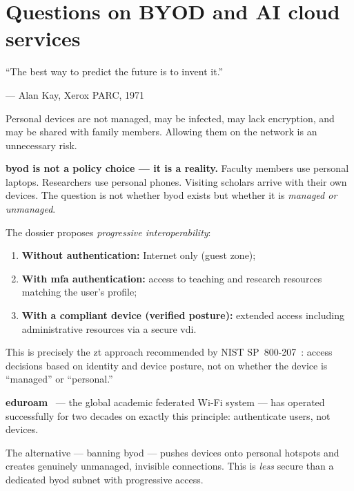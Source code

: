 \section{Questions on BYOD and AI cloud services}
\label{sec:q-byod-ai}

\epigraph{``The best way to predict the future is to invent it.''}{--- Alan Kay, Xerox PARC, 1971}

\begin{questionbox}
Personal devices are not managed, may be infected, may lack encryption, and may be shared with family members. Allowing them on the network is an unnecessary risk.
\end{questionbox}

\begin{answerbox}[Answer to Q4.1]
\textbf{\gls{byod} is not a policy choice --- it is a reality.} Faculty members use personal laptops. Researchers use personal phones. Visiting scholars arrive with their own devices. The question is not whether \gls{byod} exists but whether it is \emph{managed or unmanaged}.

\medskip\noindent The dossier proposes \emph{progressive interoperability}:
\begin{enumerate}[nosep]
    \item \textbf{Without authentication:} Internet only (guest zone);
    \item \textbf{With \gls{mfa} authentication:} access to teaching and research resources matching the user's profile;
    \item \textbf{With a compliant device (verified posture):} extended access including administrative resources via a secure \gls{vdi}.
\end{enumerate}

This is precisely the \gls{zt} approach recommended by NIST SP~800-207~\cite{nist-zt}: access decisions based on identity and device posture, not on whether the device is ``managed'' or ``personal.''

\medskip\noindent\textbf{\gls{eduroam}}~\cite{eduroam} --- the global academic federated Wi-Fi system --- has operated successfully for two decades on exactly this principle: authenticate users, not devices.

\medskip\noindent The alternative --- banning \gls{byod} --- pushes devices onto personal hotspots and creates genuinely unmanaged, invisible connections. This is \emph{less} secure than a dedicated \gls{byod} subnet with progressive access.
\end{answerbox}

